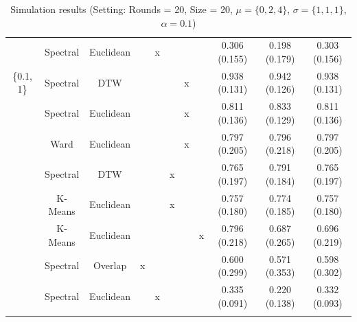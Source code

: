 \documentclass[12pt,a4paper,bibliography=totocnumbered,listof=totocnumbered]{scrartcl}
\begin{document}
{\begin{appendix}
\begin{table}[H]
\begin{tabularx}{\textwidth}{ ccccccccccc}
		& Spectral & Euclidean &  & x &  &  &  & 0.306 (0.155) & 0.198 (0.179) & 0.303 (0.156) \\ 
		\{0.1, 1\} & Spectral & DTW &  &  &  & x &  & 0.938 (0.131) & 0.942 (0.126) & 0.938 (0.131) \\ 
		& Spectral & Euclidean &  &  &  & x &  & 0.811 (0.136) & 0.833 (0.129) & 0.811 (0.136) \\ 
		& Ward  & Euclidean &  &  &  & x &  & 0.797 (0.205) & 0.796 (0.218) & 0.797 (0.205) \\ 
		& Spectral & DTW &  &  & x &  &  & 0.765 (0.197) & 0.791 (0.184) & 0.765 (0.197) \\ 
		& K-Means & Euclidean &  &  & x &  &  & 0.757 (0.180) & 0.774 (0.185) & 0.757 (0.180) \\ 
		& K-Means & Euclidean &  &  &  &  & x & 0.796 (0.218) & 0.687 (0.265) & 0.696 (0.219) \\ 
		& Spectral & Overlap & x &  &  &  &  & 0.600 (0.299) & 0.571 (0.353) & 0.598 (0.302) \\ 
		& Spectral & Euclidean &  & x &  &  &  & 0.335 (0.091) & 0.220 (0.138) & 0.332 (0.093) \\ 
		\hline \\
	\end{tabularx} 
	\caption{Simulation results (Setting: Rounds = 20, Size = 20, $\mu = \{0,2,4\}$, $\sigma =  \{1,1,1\}$, $\alpha = 0.1$)} 
	\label{tab:apstab1}
\end{table} 


\end{appendix}}
\end{document}
